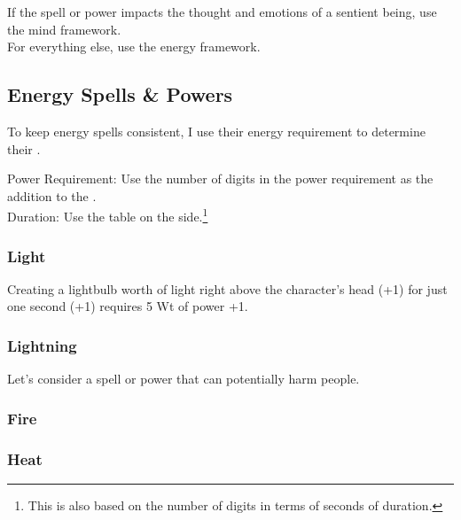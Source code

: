 \documentclass{LegrandOrangeTufteBook}
\begin{document}
If the spell or power impacts the thought and emotions of a sentient being, use the mind framework.\\

For everything else, use the energy framework.\\

\subsection*{Energy Spells \& Powers}

To keep energy spells consistent,
I use their energy requirement to determine their .

Power Requirement: Use the number of digits in the power requirement as the addition to the .\\
Duration: Use the table on the side.\footnote{This is also based on the number of digits in terms of seconds of duration.}
\marginpar{
	\footnotesize
	
}

\marginpar{
	\footnotesize
	
}


\subsubsection*{Light}

Creating a lightbulb worth of light right above the character's head (+1) for just one second (+1) requires 5 Wt of power +1.\\

\subsubsection*{Lightning}
Let's consider a spell or power that can potentially harm people.

\subsubsection*{Fire}

\subsubsection*{Heat}
\end{document}
